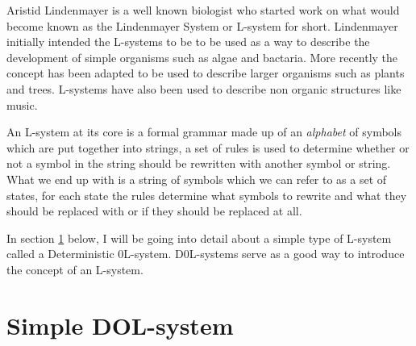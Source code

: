 \begin{flushleft}

Aristid Lindenmayer is a well known biologist who started work on what would become known as the Lindenmayer System or L-system for short. Lindenmayer initially intended the L-systems to be to be used as a way to describe the development of simple organisms such as algae and bactaria. More recently the concept has been adapted to be used to describe larger organisms such as plants and trees. L-systems have also been used to describe non organic structures like music. \cite{worth2005growing} \\

\vspace{5mm}

An L-system at its core is a formal grammar made up of an \textit{alphabet} of symbols which are put together into strings, a set of rules is used to determine whether or not a symbol in the string should be rewritten with another symbol or string. What we end up with is a string of symbols which we can refer to as a set of states, for each state the rules determine what symbols to rewrite and what they should be replaced with or if they should be replaced at all.\\

\vspace{5mm}


In section \ref{Simple DOL-systems} below, I will be going into detail about a simple type of L-system called a Deterministic 0L-system.  D0L-systems serve as a good way to introduce the concept of an L-system.

\end{flushleft}

\section{Simple DOL-system} \label{Simple DOL-systems}


